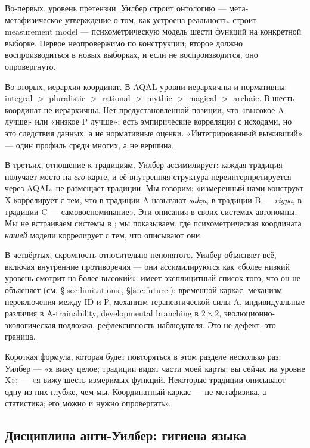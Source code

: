 Во-первых, уровень претензии. Уилбер строит онтологию --- мета-метафизическое утверждение о том, как устроена реальность. \DEIC{} строит measurement model --- психометрическую модель шести функций на конкретной выборке. Первое неопровержимо по конструкции; второе должно воспроизводиться в новых выборках, и если не воспроизводится, оно опровергнуто.

Во-вторых, иерархия координат. В AQAL уровни иерархичны и нормативны: integral $>$ pluralistic $>$ rational $>$ mythic $>$ magical $>$ archaic. В \DEIC{} шесть координат не иерархичны. Нет предустановленной позиции, что «высокое A лучше» или «низкое P лучше»; есть эмпирические корреляции с исходами, но это следствия данных, а не нормативные оценки. «Интегрированный выживший» --- один профиль среди многих, а не вершина.

В-третьих, отношение к традициям. Уилбер ассимилирует: каждая традиция получает место на \emph{его} карте, и её внутренняя структура переинтерпретируется через AQAL. \DEIC{} не размещает традиции. Мы говорим: «измеренный нами конструкт X коррелирует с тем, что в традиции A называют \textit{sākṣī}, в традиции B --- \textit{rigpa}, в традиции C --- самовоспоминание». Эти описания в своих системах автономны. Мы не встраиваем системы в \DEIC{}; мы показываем, где психометрическая координата \emph{нашей} модели коррелирует с тем, что описывают они.

В-четвёртых, скромность относительно непонятого. Уилбер объясняет всё, включая внутренние противоречия --- они ассимилируются как «более низкий уровень смотрит на более высокий». \DEIC{} имеет эксплицитный список того, что он не объясняет (см. §\ref{sec:limitations}, §\ref{sec:future}): временной каркас, механизм переключения между ID и P, механизм терапевтической силы A, индивидуальные различия в A-trainability, developmental branching в $2\times 2$, эволюционно-экологическая подложка, рефлексивность наблюдателя. Это не дефект, это граница.

Короткая формула, которая будет повторяться в этом разделе несколько раз: Уилбер --- «я вижу целое; традиции видят части моей карты; вы сейчас на уровне X»; \DEIC{} --- «я вижу шесть измеримых функций. Некоторые традиции описывают одну из них глубже, чем мы. Координатный каркас --- не метафизика, а статистика; его можно и нужно опровергать».

\subsection{Дисциплина анти-Уилбер: гигиена языка}
\label{subsec:discipline}

